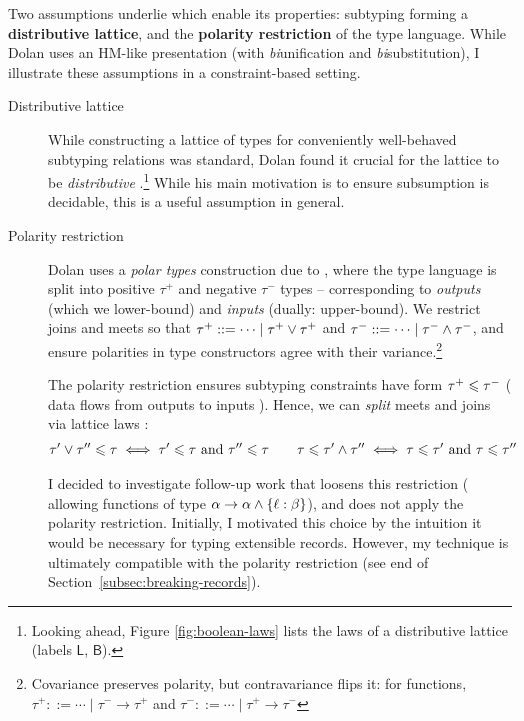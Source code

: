 Two assumptions underlie \mlsub{} which enable its properties: subtyping forming a \textbf{distributive lattice}, and the \textbf{polarity restriction} of the type language. While Dolan uses an HM-like presentation (with \emph{bi}unification and \emph{bi}substitution), I illustrate these assumptions in a constraint-based setting. \begin{description}
    \item[Distributive lattice] While constructing a lattice of types for conveniently well-behaved subtyping relations was standard, Dolan found it crucial for the lattice to be \emph{distributive} \cite[Section~3.2]{dolan-thesis}.\footnote{Looking ahead, Figure \ref{fig:boolean-laws} lists the laws of a distributive lattice (labels $\mathsf L$, $\mathsf B$).} While his main motivation is to ensure subsumption is decidable, this is a useful assumption in general.
    \item[Polarity restriction] Dolan \cite[Section~5.1]{dolan-thesis} uses a \emph{polar types} construction due to \textcite{pottier-thesis}, where the type language is split into positive $\tau^+$ and negative $\tau^-$ types -- corresponding to \emph{outputs} (which we lower-bound) and \emph{inputs} (dually: upper-bound). We restrict joins and meets so that $\tau^+ ::= \cdots \mid \tau^+ \lor \tau^+$ and $\tau^- ::= \cdots \mid \tau^- \land \tau^-$,
    and ensure polarities in type constructors agree with their variance.\footnote{Covariance preserves polarity, but contravariance flips it: for functions, $\tau^+ ::= \cdots \mid \tau^- \to \tau^+$ and $\tau^- ::= \cdots \mid \tau^+ \to \tau^-$}
    
    The polarity restriction ensures subtyping constraints have form $\tau^+ \leqslant \tau^-$ (\cf{} data flows from outputs to inputs \cite[Section~1.1]{dolan-thesis}). Hence, we can \emph{split} meets and joins via lattice laws \cite{simple-sub}: 
    \begin{align*}
        \tau' \lor \tau'' \leqslant \tau \iff \tau' \leqslant \tau \text{ and } \tau'' \leqslant \tau \qquad
        \tau \leqslant \tau' \land \tau'' \iff \tau \leqslant \tau' \text{ and } \tau \leqslant \tau''
    \end{align*}

    I decided to investigate follow-up work that loosens this restriction (\eg{} allowing functions of type $\alpha 
    \to \alpha \meet \flrec{\ell : \beta}$), and \inference{} does not apply the polarity restriction. Initially, I motivated this choice by the intuition it would be necessary for typing extensible records. However, my technique is ultimately compatible with the polarity restriction (see end of Section~\ref{subsec:breaking-records}).
\end{description}

